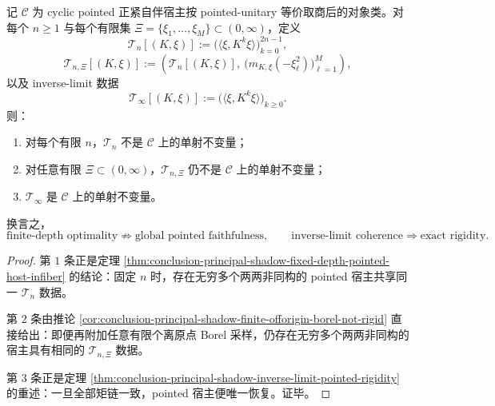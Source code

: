\begin{theorem}\label{thm:conclusion-principal-shadow-local-global-functor-boundary}
记 \(\mathcal C\) 为 cyclic pointed 正紧自伴宿主按 pointed-unitary 等价取商后的对象类。对每个 \(n\ge 1\) 与每个有限集 \(\Xi=\{\xi_1,\dots,\xi_M\}\subset(0,\infty)\)，定义
\[
\mathcal T_n[(K,\xi)]
:=
\bigl(\langle \xi,K^k\xi\rangle\bigr)_{k=0}^{2n-1},
\]
\[
\mathcal T_{n,\Xi}[(K,\xi)]
:=
\left(
\mathcal T_n[(K,\xi)],
\ \bigl(m_{K,\xi}(-\xi_\ell^2)\bigr)_{\ell=1}^{M}
\right),
\]
以及 inverse-limit 数据
\[
\mathcal T_\infty[(K,\xi)]
:=
\bigl(\langle \xi,K^k\xi\rangle\bigr)_{k\ge 0}.
\]
则：
\begin{enumerate}
\item 对每个有限 \(n\)，\(\mathcal T_n\) 不是 \(\mathcal C\) 上的单射不变量；
\item 对任意有限 \(\Xi\subset(0,\infty)\)，\(\mathcal T_{n,\Xi}\) 仍不是 \(\mathcal C\) 上的单射不变量；
\item \(\mathcal T_\infty\) 是 \(\mathcal C\) 上的单射不变量。
\end{enumerate}
换言之，
\[
\text{finite-depth optimality}
\not\Rightarrow
\text{global pointed faithfulness},
\qquad
\text{inverse-limit coherence}
\Rightarrow
\text{exact rigidity}.
\]
\end{theorem}
\begin{proof}
第 \(1\) 条正是定理 \ref{thm:conclusion-principal-shadow-fixed-depth-pointed-host-infiber} 的结论：固定 \(n\) 时，存在无穷多个两两非同构的 pointed 宿主共享同一 \(\mathcal T_n\) 数据。

第 \(2\) 条由推论 \ref{cor:conclusion-principal-shadow-finite-offorigin-borel-not-rigid} 直接给出：即便再附加任意有限个离原点 Borel 采样，仍存在无穷多个两两非同构的宿主具有相同的 \(\mathcal T_{n,\Xi}\) 数据。

第 \(3\) 条正是定理 \ref{thm:conclusion-principal-shadow-inverse-limit-pointed-rigidity} 的重述：一旦全部矩链一致，pointed 宿主便唯一恢复。证毕。
\end{proof}

